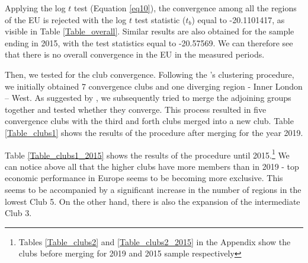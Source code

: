 \documentclass[11pt]{article}
\begin{document}
\begin{table}[!htbp] \centering 
 \caption{Log $t$ test result for all regions} 
  \label{Table_overall} 
\end{table}

Applying the log $t$ test (Equation \ref{eq10}), the convergence among all the regions of the EU is rejected with the log $t$ test statistic ($t_b$) equal to -20.1101417, as visible in Table \ref{Table_overall}. Similar results are also obtained for the sample ending in 2015, with the test statistics equal to -20.57569.  We can therefore see that there is no overall convergence in the EU in the measured periods.

Then, we tested for the club convergence. Following the \citeauthor{phillips2007transition}'s clustering procedure, we initially obtained 7 convergence clubs and one diverging region - Inner London – West. As suggested by \citet{bartkowska2012regional}, we subsequently tried to merge the adjoining groups together and tested whether they converge. This process resulted in five convergence clubs with the third and forth clubs merged into a new club. Table \ref{Table_clubs1} shows the results of the procedure after merging for the year 2019.

Table \ref{Table_clubs1_2015} shows the results of the \citeauthor{phillips2007transition} procedure until 2015.\footnote{Tables \ref{Table_clubs2} and \ref{Table_clubs2_2015} in the Appendix show the clubs before merging for 2019 and 2015 sample respectively}  We can notice above all that the higher clubs have more members than in 2019 - top economic performance in Europe seems to be becoming more exclusive. This seems to be accompanied by a significant increase in the number of regions in the lowest Club 5. On the other hand, there is also the expansion of the intermediate Club 3.
\end{document}
